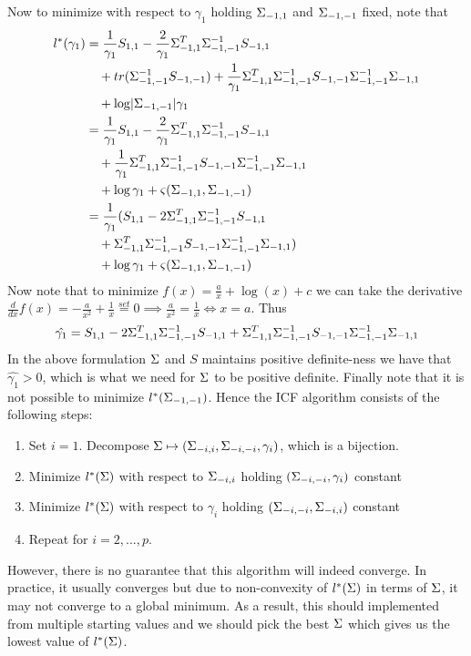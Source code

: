 \documentclass[12pt, leqno]{article}
\providecommand{\abs}[1]{\lvert#1\rvert}
\let\oldhat\hat
\renewcommand{\hat}[1]{\oldhat{{#1}}}
\def\s{\ensuremath\Sigma}
\begin{document}
Now to minimize with respect to $\gamma_1$ holding $\s_{-1,1}
$ and $\s_{-1,-1}$ fixed, note that 
\begin{align*}
l^*(\gamma_1)  &=\frac{1}{\gamma_1} S_{1,1} -\frac{2}{\gamma_1} \s_{-1,1}^T
  \s_{-1,-1}^{-1} S_{-1,1} \\ 
&\quad +tr(\s_{-1,-1}^{-1}S_{-1,-1})
                                +\frac{1}{\gamma_1} 
\s_{-1,1}^T \s_{-1,-1}^{-1} S_{-1,-1} \s_{-1,-1}^{-1}
\s_{-1,1} \\ 
&\quad + \log \abs{\s_{-1,-1}}
  \gamma_1 \\
 &=\frac{1}{\gamma_1} S_{1,1} -\frac{2}{\gamma_1} \s_{-1,1}^T
  \s_{-1,-1}^{-1} S_{-1,1} \\ 
&\quad +\frac{1}{\gamma_1} 
\s_{-1,1}^T \s_{-1,-1}^{-1} S_{-1,-1} \s_{-1,-1}^{-1}
\s_{-1,1} \\ 
&\quad + \log \gamma_1 + \varsigma (\s_{-1,1},\s_{-1,-1}) \\
 &=\frac{1}{\gamma_1} ( S_{1,1} - 2\s_{-1,1}^T
  \s_{-1,-1}^{-1} S_{-1,1} \\ 
&\quad +
\s_{-1,1}^T \s_{-1,-1}^{-1} S_{-1,-1} \s_{-1,-1}^{-1}
\s_{-1,1}) \\ 
&\quad + \log \gamma_1 + \varsigma (\s_{-1,1},\s_{-1,-1})
\end{align*}
Now note that to minimize $f(x) = \frac{a}{x} + \log(x) + c$ we can
take the derivative $\frac{d}{dx}f(x) = -\frac{a}{x^2}+\frac{1}{x}
\overset{set}{=} 0 \implies \frac{a}{x^2}=\frac{1}{x} \iff x =
a$. Thus 
\[
\hat{\gamma_1} = S_{1,1} - 2\s_{-1,1}^T
  \s_{-1,-1}^{-1} S_{-1,1} +
\s_{-1,1}^T \s_{-1,-1}^{-1} S_{-1,-1} \s_{-1,-1}^{-1}
\s_{-1,1}
\]
In the above formulation $\s$ and $S$ maintains positive definite-ness
we have that $\hat{\gamma_1}>0$, which is what we need for $\s$ to be
positive definite. Finally note that it is not possible to minimize
$l^*(\s_{-1,-1})$. Hence the ICF algorithm consists of the following
steps:
\begin{enumerate}
\item Set $i = 1$. Decompose $\s \mapsto (\s_{-i,i},\s_{-i,-i},\gamma_i)$, which is
  a bijection.
\item Minimize $l^*(\s)$ with respect to $\s_{-i,i}$ holding
  $(\s_{-i,-i},\gamma_i)$ constant
\item Minimize $l^*(\s)$ with respect to $\gamma_i$ holding
  $(\s_{-i,-i},\s_{-i,i})$ constant
\item Repeat for $i = 2,...,p$.
\end{enumerate}
However, there is no guarantee that this algorithm will indeed
converge. In practice, it usually converges but due to non-convexity of
$l^*(\s)$ in terms of $\s$, it may not converge to a global
minimum. As a result, this should implemented from multiple starting
values and we should pick the best $\s$ which gives us the lowest
value of $l^*(\s)$. 
\end{document}
